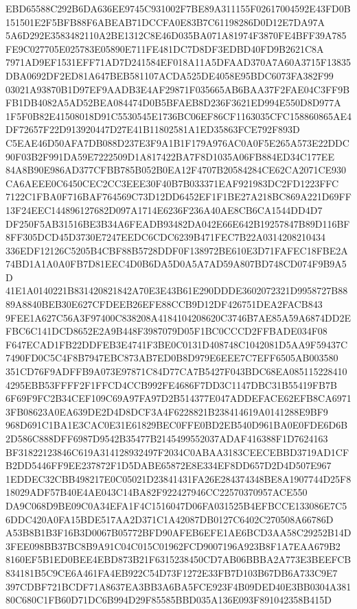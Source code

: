 \documentclass[UTF8,fontset=fandol,zihao=-4,a4paper]{ctexart}
\begin{document}
{{EBD65588C292B6DA636EE9745C931002F7BE89A311155F02617004592E43FD0B151501E2F5BFB88F6ABEAB71DCCFA0E83B7C61198286D0D12E7DA97A
5A6D292E3583482110A2BE1312C8E46D035BA071A81974F3870FE4BFF39A785FE9C027705E025783E05890E711FE481DC7D8DF3EDBD40FD9B2621C8A
7971AD9EF1531EFF71AD7D241584EF018A11A5DFAAD370A7A60A3715F13835DBA0692DF2ED81A647BEB581107ACDA525DE4058E95BDC6073FA382F99
03021A93870B1D97EF9AADB3E4AF29871F035665AB6BAA37F2FAE04C3FF9BFB1DB4082A5AD52BEA084474D0B5BFAEB8D236F3621ED994E550D8D977A
1F5F0B82E41508018D91C5530545E1736BC06EF86CF1163035CFC158860865AE4DF72657F22D913920447D27E41B11802581A1ED35863FCE792F893D
C5EAE46D50AFA7DB088D237E3F9A1B1F179A976AC0A0F5E265A573E22DDC90F03B2F991DA59E7222509D1A817422BA7F8D1035A06FB884ED34C177EE
84A8B90E986AD377CFBB785B052B0EA12F4707B20584284CE62CA2071CE930CA6AEEE0C6450CEC2CC3EEE30F40B7B033371EAF921983DC2FD1223FFC
7122C1FBA0F716BAF764569C73D12DD6452EF1F1BE27A218BC869A221D69FF13F24EEC144896127682D097A1714E6236F236A40AE8CB6CA1544DD4D7
DF250F5AB31516BE3B34A6FEADB93482DA042E66E642B19257847B89D116BF8FF305DCD45D3730E7247EEDC6CDC6239B471FEC7B22A0314208210434
336EDF12126C5205B4CBF88B5728DDF0F138972BE610E3D71FAFEC18FBE2A74BD1A1A0A0FB7D81EEC4D0B6DA5D0A5A7AD59A807BD748CD074F9B9A5D
41E1A0140221B831420821842A70E3E43B61E290DDDE3602072321D9958727B8889A8840BEB30E627CFDEEB26EFE88CCB9D12DF426751DEA2FACB843
9FEE1A627C56A3F97400C838208A4184104208620C3746B7AE85A59A6874DD2EFBC6C141DCD8652E2A9B448F3987079D05F1BC0CCCD2FFBADE034F08
F647ECAD1FB22DDFEB3E4741F3BE0C0131D408748C1042081D5AA9F59437C7490FD0C5C4F8B7947EBC873AB7ED0B8D979E6EEE7C7EFF6505AB003580
351CD76F9ADFFB9A073E97871C84D77CA7B5427F043BDC68EA0851152284104295EBB53FFFF2F1FFCD4CCB992FE4686F7DD3C1147DBC31B55419FB7B
6F69F9FC2B34CEF109C69A97FA97D2B514377E047ADDEFACE62EFB8CA69713FB08623A0EA639DE2D4D8DCF3A4F6228821B238414619A0141288E9BF9
968D691C1BA1E3CAC0E31E61829BEC0FFE0BD2EB540D961BA0E0FDE6D6B2D586C888DFF6987D9542B35477B2145499552037ADAF416388F1D7624163
BF31822123846C619A314128932497F2034C0ABAA3183CEECEBBD3719AD1CFB2DD5446FF9EE237872F1D5DABE65872E8E334EF8DD657D2D4D507E967
1EDDEC32CBB498217E0C05021D23841431FA26E284374348BE8A1907744D25F818029ADF57B40E4AE043C14BA82F922427946CC22570370957ACE550
DA9C068D9BE09C0A34EFA1F4C1516047D06FA031525B4EFBCCE133086E7C56DDC420A0FA15BDE517AA2D371C1A42087DB0127C6402C270508A66786D
A53B8B1B3F16B3D0067B05772BFD90AFEB6EFE1AE6BCD3AA58C29252B14D3FEE098BB37BC8B9A91C04C015C01962FCD9007196A923B8F1A7EAA679B2
8160EF5B1ED0BEE4EBD873B21F6315238450CD7AB06BBBA2A773E3BEEFCB834181B5C9CE6A461FA4EB922C54D73F1272E33FB7D103B67DB6A733C9E7
397CDBF721BCDF71A8637EA3BB3A6BA5FCE923F4B09DED40E3BB0304A38180C680C1FB60D71DC6B994D29F85585BBD035A136E093F891042358B415D
}}
\end{document}
